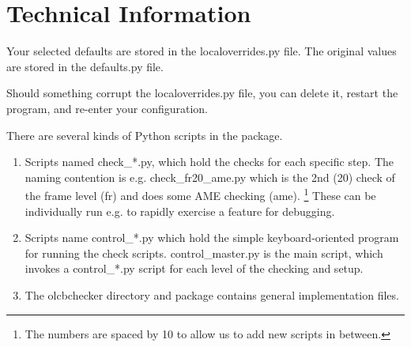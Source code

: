 \section{Technical Information}

Your selected defaults are stored in the localoverrides.py file.
The original values are stored in the defaults.py file.

Should something corrupt the localoverrides.py file,
you can delete it, restart the program, and re-enter your configuration.

There are several kinds of Python scripts in the package.
\begin{enumerate}
\item Scripts named check\_*.py, which hold the checks for each specific step.
    The naming contention is e.g. check\_fr20\_ame.py which is the 2nd (20)
    check of the frame level (fr) and does some AME checking (ame).
    \footnote{The numbers are spaced by 10 to allow us to add new scripts in between.}
    These can be individually run e.g. to rapidly exercise a feature for debugging.
\item Scripts name control\_*.py which hold the simple keyboard-oriented
    program for running the check scripts.  control\_master.py is the
    main script, which invokes a control\_*.py script for each level of the
    checking and setup.
\item The olcbchecker directory and package contains general implementation
    files.
\end{enumerate}




